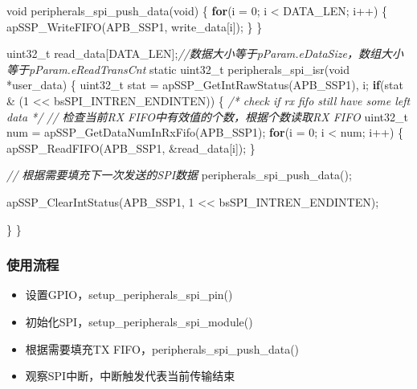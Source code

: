 \documentclass[
  12pt,
]{book}
\newenvironment{Shaded}{\begin{snugshade}}{\end{snugshade}}
\newcommand{\CommentTok}[1]{\textcolor[rgb]{0.56,0.35,0.01}{\textit{#1}}}
\newcommand{\ControlFlowTok}[1]{\textcolor[rgb]{0.13,0.29,0.53}{\textbf{#1}}}
\newcommand{\DataTypeTok}[1]{\textcolor[rgb]{0.13,0.29,0.53}{#1}}
\newcommand{\DecValTok}[1]{\textcolor[rgb]{0.00,0.00,0.81}{#1}}
\newcommand{\NormalTok}[1]{#1}
\providecommand{\tightlist}{%
  \setlength{\itemsep}{0pt}\setlength{\parskip}{0pt}}
\begin{document}
\begin{Shaded}
\begin{Highlighting}[]
\DataTypeTok{void}\NormalTok{ peripherals_spi_push_data(}\DataTypeTok{void}\NormalTok{)}
\NormalTok{\{}
    \ControlFlowTok{for}\NormalTok{(i = }\DecValTok{0}\NormalTok{; i < DATA_LEN; i++)}
\NormalTok{    \{}
\NormalTok{      apSSP_WriteFIFO(APB_SSP1, write_data[i]);}
\NormalTok{    \}}
\NormalTok{\}}

\DataTypeTok{uint32_t}\NormalTok{ read_data[DATA_LEN];}\CommentTok{//数据大小等于pParam.eDataSize，数组大小等于pParam.eReadTransCnt}
\DataTypeTok{static} \DataTypeTok{uint32_t}\NormalTok{ peripherals_spi_isr(}\DataTypeTok{void}\NormalTok{ *user_data)}
\NormalTok{\{}
  \DataTypeTok{uint32_t}\NormalTok{ stat = apSSP_GetIntRawStatus(APB_SSP1), i;}
  \ControlFlowTok{if}\NormalTok{(stat & (}\DecValTok{1}\NormalTok{ << bsSPI_INTREN_ENDINTEN))}
\NormalTok{  \{}
    \CommentTok{/* check if rx fifo still have some left data */}
    \CommentTok{// 检查当前RX FIFO中有效值的个数，根据个数读取RX FIFO}
    \DataTypeTok{uint32_t}\NormalTok{ num = apSSP_GetDataNumInRxFifo(APB_SSP1);}
    \ControlFlowTok{for}\NormalTok{(i = }\DecValTok{0}\NormalTok{; i < num; i++)}
\NormalTok{    \{}
\NormalTok{      apSSP_ReadFIFO(APB_SSP1, &read_data[i]);}
\NormalTok{    \}}

    \CommentTok{// 根据需要填充下一次发送的SPI数据}
\NormalTok{    peripherals_spi_push_data();}
    
\NormalTok{    apSSP_ClearIntStatus(APB_SSP1, }\DecValTok{1}\NormalTok{ << bsSPI_INTREN_ENDINTEN);}
    
\NormalTok{  \}}
\NormalTok{\}}
\end{Highlighting}
\end{Shaded}

\hypertarget{ux4f7fux7528ux6d41ux7a0b-13}{%
\subsubsection{使用流程}\label{ux4f7fux7528ux6d41ux7a0b-13}}

\begin{itemize}
\tightlist
\item
  设置GPIO，setup\_peripherals\_spi\_pin()
\item
  初始化SPI，setup\_peripherals\_spi\_module()
\item
  根据需要填充TX FIFO，peripherals\_spi\_push\_data()
\item
  观察SPI中断，中断触发代表当前传输结束
\end{itemize}
\end{document}
